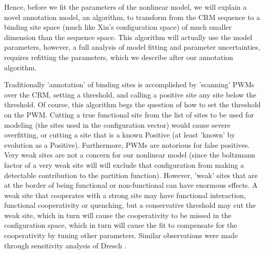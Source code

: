 
Hence, before we fit the parameters of the nonlinear model, we will explain a novel annotation model, an algorithm, to transform from the CRM sequence to a binding site space (much like Xin's configuration space) of much smaller dimension than the sequence space.  This algorithm will actually use the model parameters, however, a full analysis of model fitting and parameter uncertainties, requires refitting the parameters, which we describe after our annotation algorithm.

  Traditionally 'annotation' of binding sites is accomplished by 'scanning' PWMs over the CRM, setting a threshold, and calling a positive site any site below the threshold.  Of course, this algorithm begs the question of how to set the threshold on the PWM.  Cutting a true functional site from the list of sites to be used for modeling (the sites used in the configuration vector) would cause severe overfitting, or cutting a site that is a known Positive (at least 'known' by evolution as a Positive).  Furthermore, PWMs are notorious for false positives.  Very weak sites are not a concern for our nonlinear model (since the boltzmann factor of a very weak site will will exclude that configuration from making a detectable contribution to the partition function).  However, 'weak' sites that are at the border of being functional or non-functional can have enormous effects.  A weak site that cooperates with a strong site may have functional interaction, functional cooperativity or quenching, but a conservative threshold may cut the weak site, which in turn will cause the cooperativity to be missed in the configuration space, which in turn will cause the fit to compensate for the cooperativity by tuning other parameters.  Similar observations were made through sensitivity analysis of Dresch \cite{pmid20969803}. 




